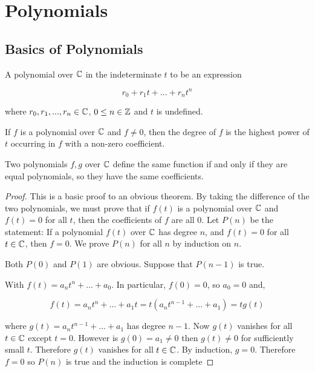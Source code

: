 
\section{Polynomials}
\subsection{Basics of Polynomials}

\begin{definition}
    A polynomial over $\mathbb C$ in the indeterminate $t$ to be an expression 

$$
    r_0 + r_1 t +...+ r_n t^n
$$

    where $r_0,r_1,...,r_n \in \mathbb C$, $0 \le n \in \mathbb Z$ and $t$ is undefined.
\end{definition}

\begin{definition}
    If $f$ is a polynomial over $\mathbb C$ and $f \neq 0$, then the degree of $f$ is the highest power of $t$ occurring in $f$ with a non-zero coefficient.
\end{definition}

\begin{theorem}
    Two polynomials $f,g$ over $\mathbb C$ define the same function if and only if they are equal polynomials, so they have the same coefficients.
\end{theorem}

\begin{proof}
    This is a basic proof to an obvious theorem. By taking the difference of the two polynomials, we must prove that if $f(t)$ is a polynomial over $\mathbb C$ and $f(t) = 0$ for all $t$, then the coefficients of $f$ are all 0. Let $P(n)$ be the statement: If a polynomial $f(t)$ over $\mathbb C$ has degree $n$, and $f(t) = 0$ for all $t \in \mathbb C$, then $f=0$. We prove $P(n)$ for all $n$ by induction on $n$. 
    
    Both $P(0)$ and $P(1)$ are obvious. Suppose that $P(n-1)$ is true. 

    With $f(t) = a_n t^n +...+ a_0$. In particular, $f(0) = 0$, so $a_0 = 0$ and,

    $$
    f(t) = a_n t^n +...+ a_1 t= t(a_n t^{n-1} +...+ a_1) = tg(t)
    $$

    where $g(t) = a_n t^{n-1} +...+ a_1$ has degree $n-1$. Now $g(t)$ vanishes for all $t \in \mathbb C$ except $t=0$. However is $g(0) = a_1 \neq 0$ then $g(t) \neq 0$ for sufficiently small $t$. Therefore $g(t)$ vanishes for all $t \in \mathbb C$. By induction, $g=0$. Therefore $f=0$ so $P(n)$ is true and the induction is complete
\end{proof}

